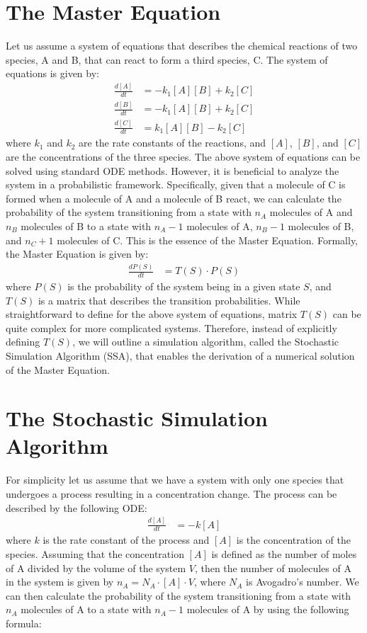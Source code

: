 \documentclass[12pt]{article}
\begin{document}
\section{The Master Equation}
Let us assume a system of equations that describes the chemical reactions of two species, A and B, that can react to form a third species, C. The system of equations is given by:
\begin{align}
\frac{d[A]}{dt} &= -k_1 [A] [B] + k_2 [C] \\
\frac{d[B]}{dt} &= -k_1 [A] [B] + k_2 [C] \\
\frac{d[C]}{dt} &= k_1 [A] [B] - k_2 [C]
\end{align}
where $k_1$ and $k_2$ are the rate constants of the reactions, and $[A]$, $[B]$, and $[C]$ are the concentrations of the three species. The above system of equations can be solved using standard ODE methods. However, it is beneficial to analyze the system in a probabilistic framework. Specifically, given that a molecule of C is formed when a molecule of A and a molecule of B react, we can calculate the probability of the system transitioning from a state with $n_A$ molecules of A and $n_B$ molecules of B to a state with $n_A-1$ molecules of A, $n_B-1$ molecules of B, and $n_C+1$ molecules of C. This is the essence of the Master Equation. Formally, the Master Equation is given by:
\begin{align}
\frac{dP(S)}{dt} &= T(S) \cdot P(S)
\label{eq:ME}
\end{align}
where $P(S)$ is the probability of the system being in a given state $S$, and $T(S)$ is a matrix that describes the transition probabilities.  While straightforward to define for the above system of equations, matrix $T(S)$ can be quite complex for more complicated systems. Therefore, instead of explicitly defining $T(S)$, we will outline a simulation algorithm, called the Stochastic Simulation Algorithm (SSA), that enables the derivation of a numerical solution of the Master Equation.
\section{The Stochastic Simulation Algorithm}
For simplicity let us assume that we have a system with only one species that undergoes a process resulting in a concentration change. The process can be described by the following ODE:
\begin{align}
\frac{d[A]}{dt} &= -k [A] 
\label{eq:ODE1}
\end{align}
where $k$ is the rate constant of the process and $[A]$ is the concentration of the species.  Assuming that the concentration $[A]$ is defined as the number of moles of A divided by the volume of the system $V$, then the number of molecules of A in the system is given by $n_A = N_A \cdot [A] \cdot V$, where $N_A$ is Avogadro's number. We can then calculate the probability of the system transitioning from a state with $n_A$ molecules of A to a state with $n_A-1$ molecules of A by using the following formula:
\end{document}

